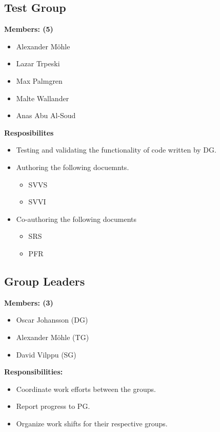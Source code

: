 \documentclass{article}
\begin{document}
    \subsection{Test Group}
        \textbf{Members: (5)}
        \begin{itemize}
            \item Alexander Möhle
            \item Lazar Trpeski
            \item Max Palmgren
            \item Malte Wallander
            \item Anas Abu Al-Soud
        \end{itemize}
        \textbf{Resposibilites}
        \begin{itemize}
            \item Testing and validating the functionality of code written by DG.
            \item Authoring the following docuemnts.
            \begin{itemize}
                \item SVVS
                \item SVVI
            \end{itemize}
            \item Co-authoring the following documents
                \begin{itemize}
                    \item SRS
                    \item PFR
                \end{itemize}
        \end{itemize}
    
    \subsection{Group Leaders}
        \textbf{Members: (3)}
        \begin{itemize}
            \item Oscar Johansson (DG)
            \item Alexander Möhle (TG)
            \item David Vilppu (SG)
        \end{itemize}
        \textbf{Responsibilities: }
        \begin{itemize}
            \item Coordinate work efforts between the groups. 
            \item Report progress to PG.
            \item Organize work shifts for their respective groups. 
        \end{itemize}
        
\end{document}
